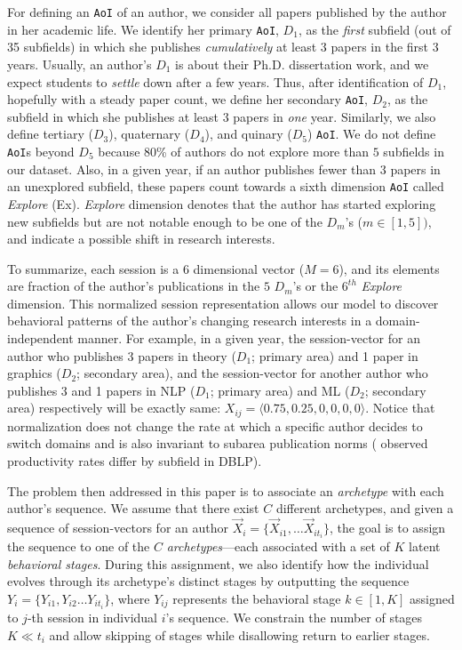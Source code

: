 \documentclass[10pt,letterpaper]{article}
\begin{document}
For defining an \texttt{AoI} of an author, we consider all papers published by the author in her academic life. We identify her primary \texttt{AoI}, $D_1$, as the \emph{first} subfield (out of 35 subfields) in which she publishes \emph{cumulatively} at least $3$ papers in the first 3 years. Usually, an author's $D_1$ is about their Ph.D. dissertation work, and we expect students to \emph{settle} down after a few years. Thus, after identification of $D_1$, hopefully with a steady paper count, we define her secondary \texttt{AoI}, $D_2$, as the subfield in which she publishes at least $3$ papers in \emph{one} year. Similarly, we also define tertiary ($D_3$), quaternary ($D_4$), and quinary ($D_5$) \texttt{AoI}. We do not define \texttt{AoI}s beyond $D_5$ because 80\% of authors do not explore more than $5$ subfields in our dataset. Also, in a given year, if an author publishes fewer than $3$ papers in an unexplored subfield, these papers count towards a sixth dimension \texttt{AoI} called \emph{Explore} (Ex).  \emph{Explore} dimension denotes that the author has started exploring new subfields but are not notable enough to be one of the $D_m$'s ($m \in {[1,5]})$, and indicate a possible shift in research interests.

To summarize, each session is a $6$ dimensional vector ($M=6$), and its elements are fraction of the author's publications in the $5$ $D_m$'s or the $6^{th}$ \emph{Explore} dimension. This normalized session representation allows our model to discover behavioral patterns of the author's changing research interests in a domain-independent manner. For example, in a given year, the session-vector for an author who publishes 3 papers in theory ($D_1$; primary area) and 1 paper in graphics ($D_2$; secondary area), and the session-vector for another author who publishes 3 and 1 papers in NLP ($D_1$; primary area) and ML ($D_2$; secondary area) respectively will be exactly same: $X_{ij} = \langle 0.75, 0.25, 0, 0, 0, 0\rangle$. Notice that normalization does not change the rate at which a specific author decides to switch domains and is also invariant to subarea publication norms (\cite{Way:2016} observed productivity rates differ by subfield in DBLP).


The problem then addressed in this paper is to associate an \emph{archetype} with each author's sequence.
We assume that there exist $C$ different archetypes, and given a sequence of session-vectors for an author $\vec{X}_i = \{\vec{X}_{i 1}, \ldots \vec{X}_{i t_i} \}$, the goal is to assign the sequence to one of the $C$ \emph{archetypes}---each associated with a set of $K$ latent \emph{behavioral stages}. During this assignment, we also identify how the individual evolves through its archetype's distinct stages by outputting the sequence $Y_i = \{Y_{i 1}, Y_{i 2} \ldots Y_{i t_i} \}$, where $Y_{i j}$ represents the behavioral stage $k \in [1,K] $ assigned to $j$-th session in individual $i$'s sequence. We constrain the number of stages $ K \ll t_i$ and allow skipping of stages while disallowing return to earlier stages.
\end{document}
